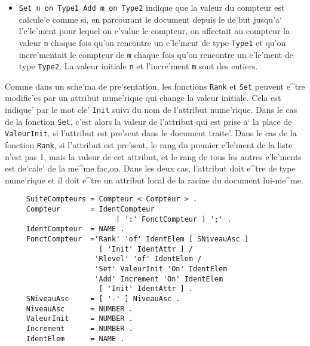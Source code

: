 {\begin{itemize}
\item
{\tt Set n on Type1 Add m on Type2} indique que la valeur du compteur est
calcule'e comme si, en parcourant le document depuis le de'but jusqu'a`
l'e'le'ment pour lequel on e'value le compteur, on affectait au compteur la
valeur {\tt n} chaque fois qu'on rencontre un e'le'ment de type {\tt Type1}
et qu'on incre'mentait le compteur de {\tt m} chaque fois qu'on rencontre
un e'le'ment de type {\tt Type2}. La valeur initiale {\tt n} et l'incre'ment
{\tt m} sont des entiers.
\end{itemize}

Comme dans un sche'ma de pre'sentation, les fonctions {\tt Rank} et
{\tt Set} peuvent e^tre modifie'es par un attribut nume'rique qui change
la valeur initiale. Cela est indique' par le mot cle' {\tt Init} suivi du
nom de l'attribut nume'rique. Dans le cas de la fonction {\tt Set}, c'est
alors la valeur de l'attribut qui est prise a` la place de {\tt ValeurInit},
si l'attribut est pre'sent dans le document traite'.
Dans le cas de la fonction {\tt Rank}, si l'attribut est pre'sent, le rang
du premier e'le'ment de la liste n'est pas 1, mais la valeur de cet attribut,
et le rang de tous les autres e'le'ments est de'cale' de la me^me fac,on.
Dans les deux cas, l'attribut doit e^tre de type nume'rique et il doit e^tre
un attribut local de la racine du document lui-me^me.

\begin{verbatim}
     SuiteCompteurs = Compteur < Compteur > .
     Compteur       = IdentCompteur
                          [ ':' FonctCompteur ] ';' .
     IdentCompteur  = NAME .
     FonctCompteur  ='Rank' 'of' IdentElem [ SNiveauAsc ]
                      [ 'Init' IdentAttr ] /
                     'Rlevel' 'of' IdentElem /
                     'Set' ValeurInit 'On' IdentElem
                     'Add' Increment 'On' IdentElem
                      [ 'Init' IdentAttr ] .
     SNiveauAsc     = [ '-' ] NiveauAsc .
     NiveauAsc      = NUMBER .
     ValeurInit     = NUMBER .
     Increment      = NUMBER .
     IdentElem      = NAME .
\end{verbatim}

}

